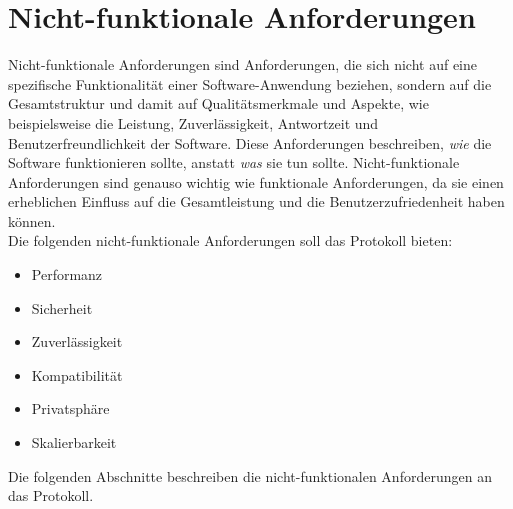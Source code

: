 \section{Nicht-funktionale Anforderungen}


Nicht-funktionale Anforderungen sind Anforderungen, die sich nicht auf eine 
spezifische Funktionalität einer Software-Anwendung beziehen, sondern auf die Gesamtstruktur und damit auf
Qualitätsmerkmale und Aspekte, wie beispielsweise die Leistung, Zuverlässigkeit, Antwortzeit und Benutzerfreundlichkeit 
der Software. 
Diese Anforderungen beschreiben, \textit{wie} die Software funktionieren sollte, anstatt \textit{was} sie tun sollte. 
Nicht-funktionale Anforderungen sind genauso wichtig wie funktionale Anforderungen, da sie einen 
erheblichen Einfluss auf die Gesamtleistung und die Benutzerzufriedenheit haben können.
\\
Die folgenden nicht-funktionale Anforderungen soll das Protokoll bieten:

\begin{itemize}
    \item Performanz
    \item Sicherheit
    \item Zuverlässigkeit
    \item Kompatibilität
    \item Privatsphäre
    \item Skalierbarkeit
\end{itemize}

\noindent Die folgenden Abschnitte beschreiben die nicht-funktionalen Anforderungen an das Protokoll.